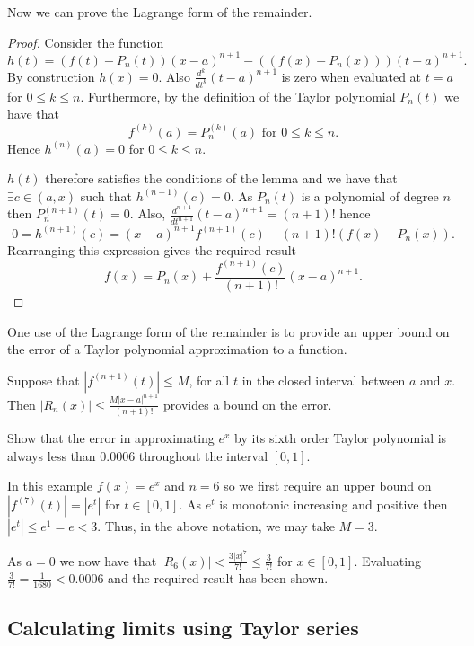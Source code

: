 \documentclass[10pt, a4paper]{article}
\begin{document}
Now we can prove the Lagrange form of the remainder.
\begin{proof}
    Consider the function
    \[
    h(t) = (f(t) - P_n(t))(x - a) ^ {n + 1} - ((f(x) - P_n(x)))(t - a) ^ {n + 1}.
    \]
    By construction $h(x) = 0$.
    Also $\frac{d ^ k}{dt ^ k}(t - a) ^ {n + 1}$ is zero when evaluated at $t = a$ for $0 \leq k \leq n$.
    Furthermore,
    by the definition of the Taylor polynomial $P_n(t)$ we have that
    \[
    f ^ {(k)}(a) = P_n^{(k)}(a)\text{ for } 0 \leq k \leq n.
    \]
    Hence $h ^ {(n)}(a) = 0$ for $0 \leq k \leq n$.

    $h(t)$ therefore satisfies the conditions of the lemma and we have that $\exists c \in (a, x)$ such that $h ^ {(n + 1)}(c) = 0$.
    As $P_n(t)$ is a polynomial of degree $n$ then $P_n ^ {(n + 1)}(t) = 0$.
    Also,
    $\frac{d ^ {n + 1}}{dt ^ {n + 1}}(t - a) ^ {n + 1} = (n + 1)!$ hence
    \[
    0 = h ^ {(n + 1)}(c) = (x - a) ^ {n + 1}f ^ {(n + 1)}(c) - (n + 1)!(f(x) - P_n(x)).
    \]
    Rearranging this expression gives the required result
    \[
    f(x) = P_n(x) + \frac{f ^ {(n + 1)}(c)}{(n + 1)!}(x - a) ^ {n + 1}.
    \]
\end{proof}

One use of the Lagrange form of the remainder is to provide an upper bound on the error of a Taylor polynomial approximation to a function.

Suppose that $|f ^ {(n + 1)}(t)| \leq M$,
for all $t$ in the closed interval between $a$ and $x$.
Then $|R_n(x)| \leq \frac{M|x - a| ^ {n + 1}}{(n + 1)!}$ provides a bound on the error.

\begin{example}
    Show that the error in approximating $e ^ x$ by its sixth order Taylor polynomial is always less than $0.0006$ throughout the interval $[0, 1]$.

    In this example $f(x) = e ^ x$ and $n = 6$ so we first require an upper bound on $|f ^ {(7)}(t)| = |e ^ t|$ for $t \in [0, 1]$.
    As $e ^ t$ is monotonic increasing and positive then $|e ^ t| \leq e ^ 1 = e < 3$.
    Thus,
    in the above notation,
    we may take $M = 3$.

    As $a = 0$ we now have that $|R_6(x)| < \frac{3|x| ^ 7}{7!} \leq \frac{3}{7!}$ for $x \in [0, 1]$.
    Evaluating $\frac{3}{7!} = \frac{1}{1680} < 0.0006$ and the required result has been shown.
\end{example}

\subsection{Calculating limits using Taylor series}
\end{document}

